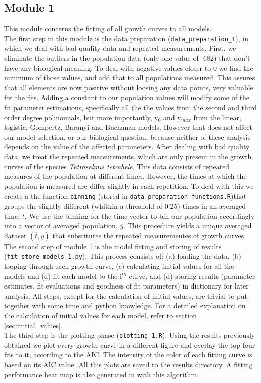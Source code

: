 \documentclass[titlepage,11pt]{article}
\begin{document}
\begin{linenumbers}
	\subsection{Module 1}
	This module concerns the fitting of all growth curves to all models.\\
	The first step in this module is the data preparation (\verb|data_preparation_1|), in which we deal with bad quality data and repeated measurements. First, we eliminate the outliers in the population data (only one value of -682) that don't have any biological meaning. To deal with negative values closer to 0 we find the minimum of those values, and add that to all populations measured. This assures that all elements are now positive without loosing any data points, very valuable for the fits. Adding a constant to our population values will modify some of the fit parameter estimations, specifically all the the values from the second and third order degree polinomials, but more importantly, y$_0 $ and y$ _{max} $ from the linear, logistic, Gompertz, Baranyi and Buchanan models. However that does not affect our model selection, or our biological question, because neither of these analysis depends on the value of the affected parameters. After dealing with bad quality data, we treat the repeated measurements, which are only present in the growth curves of the species  \textit{Tetraselmis tetrahele}. This data consists of repeated measures of the population at different times. However, the times at which the population is measured are differ slightly  in each repetition. To deal with this we create a the function \verb|binning| (stored in \verb|data_preparation_functions.R|)that groups the slightly different (whithin a threshold of 0.25) times in an averaged time, $  \overline{t}$. We use the binning for the time vector to bin our population accordingly into a vector of averaged population, {$\overline{y}$}. This procedure yields a unique averaged dataset $ \left(\overline{t}, \overline{y}\right) $ that substitutes the repeated measurementes of growth curves.\\
	The second step of module 1 is the model fitting and storing of results (\verb|fit_store_models_1.py|). This process consists of: (a) loading the data, (b) looping through each growth curve, (c) calculating initial values for all the models and (d) fit each model to the i$ ^{th} $ curve, and (d) storing results (parameter estimates, fit evaluations and goodness of fit parameters) in dictionary for later analysis. All steps, except for the calculation of initial values, are trivial to put together with some time and python knowledge. For a detailed explanation on the calculation of initial values for each model, refer to section \ref{sec:initial_values}.\\
	The third step is the plotting phase (\verb|plotting_1.R|). Using the results previously obtained we plot every growth curve in a different figure and overlay the top four fits to it, according to the AIC. The intensity of the color of each fitting curve is based on its AIC value. All this plots are saved to the results directory. A fitting performance heat map is also generated in with this algorithm.

\end{linenumbers}
\end{document}
